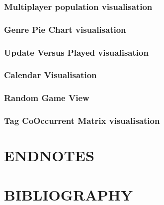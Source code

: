 \documentclass[11pt]{article}
\begin{document}
\subsubsection*{Multiplayer population visualisation}

\subsubsection*{Genre Pie Chart visualisation}

\subsubsection*{Update Versus Played visualisation}

\subsubsection*{Calendar Visualisation}

\subsubsection*{Random Game View}

\subsubsection*{Tag CoOccurrent Matrix visualisation}



\section*{ENDNOTES}
\theendnotes

\section*{BIBLIOGRAPHY}
\printbibliography
\end{document}
